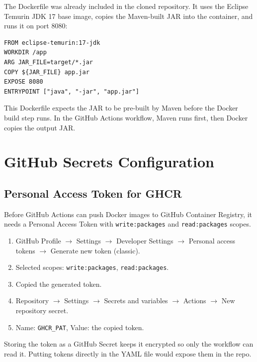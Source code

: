 \documentclass[11pt,letterpaper]{article}
\begin{document}
The Dockerfile was already included in the cloned repository. It uses the Eclipse Temurin JDK 17 base image, copies the Maven-built JAR into the container, and runs it on port 8080:

\begin{lstlisting}[caption={Dockerfile}]
FROM eclipse-temurin:17-jdk
WORKDIR /app
ARG JAR_FILE=target/*.jar
COPY ${JAR_FILE} app.jar
EXPOSE 8080
ENTRYPOINT ["java", "-jar", "app.jar"]
\end{lstlisting}

This Dockerfile expects the JAR to be pre-built by Maven before the Docker build step runs. In the GitHub Actions workflow, Maven runs first, then Docker copies the output JAR.

\section{GitHub Secrets Configuration}

\subsection{Personal Access Token for GHCR}

Before GitHub Actions can push Docker images to GitHub Container Registry, it needs a Personal Access Token with \texttt{write:packages} and \texttt{read:packages} scopes.

\begin{enumerate}[nosep]
  \item GitHub Profile $\rightarrow$ Settings $\rightarrow$ Developer Settings $\rightarrow$ Personal access tokens $\rightarrow$ Generate new token (classic).
  \item Selected scopes: \texttt{write:packages}, \texttt{read:packages}.
  \item Copied the generated token.
  \item Repository $\rightarrow$ Settings $\rightarrow$ Secrets and variables $\rightarrow$ Actions $\rightarrow$ New repository secret.
  \item Name: \texttt{GHCR\_PAT}, Value: the copied token.
\end{enumerate}

Storing the token as a GitHub Secret keeps it encrypted so only the workflow can read it. Putting tokens directly in the YAML file would expose them in the repo.
\end{document}
